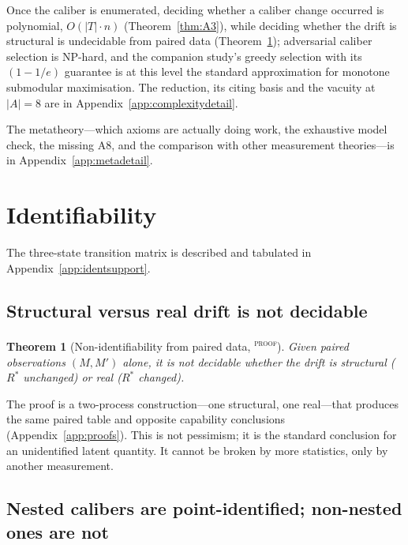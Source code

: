 \documentclass{article}
\newtheorem{theorem}{Theorem}
\newcommand{\Rstar}{R^{*}}
\newcommand{\evtag}[1]{\textsuperscript{\textsc{#1}}}
\begin{document}
Once the caliber is enumerated, deciding whether a caliber change occurred is polynomial, $O(|T|\cdot n)$
(Theorem~\ref{thm:A3}), while deciding whether the drift is structural is undecidable from paired data
(Theorem~\ref{thm:A1}); adversarial caliber selection is NP-hard, and the companion study's greedy selection
with its $(1-1/e)$ guarantee is at this level the standard approximation for monotone submodular
maximisation. The reduction, its citing basis and the vacuity at $|A|=8$ are in
Appendix~\ref{app:complexitydetail}.


The metatheory---which axioms are actually doing work, the exhaustive model check, the missing
A8, and the comparison with other measurement theories---is in Appendix~\ref{app:metadetail}.

\section{Identifiability}
\label{sec:ident}


The three-state transition matrix is described and tabulated in Appendix~\ref{app:identsupport}.

\subsection{Structural versus real drift is not decidable}
\label{sec:A1}

\begin{theorem}[Non-identifiability from paired data, \evtag{proof}]
\label{thm:A1}
Given paired observations $(M,M')$ alone, it is not decidable whether the drift is structural
($\Rstar$ unchanged) or real ($\Rstar$ changed).
\end{theorem}

The proof is a two-process construction---one structural, one real---that produces the same paired table
and opposite capability conclusions (Appendix~\ref{app:proofs}). This is not pessimism; it is the standard
conclusion for an unidentified latent quantity. It cannot be broken by more statistics, only by another
measurement.

\subsection{Nested calibers are point-identified; non-nested ones are not}
\label{sec:A2}
\end{document}
